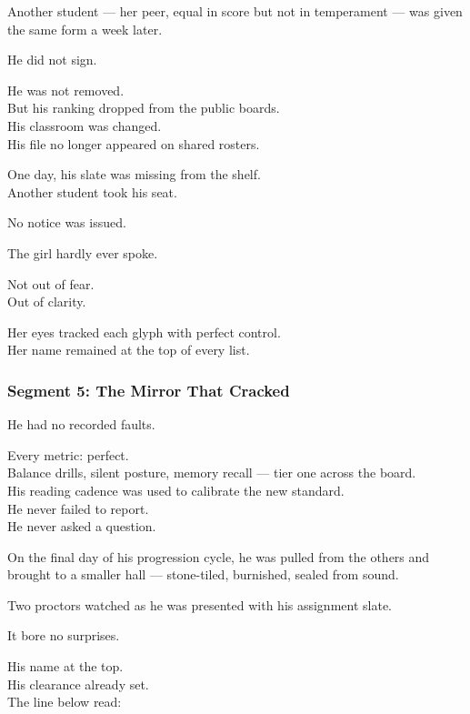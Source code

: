 \documentclass[9pt]{article}
\begin{document}
\vspace{1em}

Another student — her peer, equal in score but not in temperament — was given the same form a week later.

He did not sign.

He was not removed.\\
But his ranking dropped from the public boards.\\
His classroom was changed.\\
His file no longer appeared on shared rosters.

One day, his slate was missing from the shelf.\\
Another student took his seat.

No notice was issued.

\vspace{1em}

The girl hardly ever spoke.

Not out of fear.\\
Out of clarity.

Her eyes tracked each glyph with perfect control.\\
Her name remained at the top of every list.

\newpage

\subsubsection*{Segment 5: The Mirror That Cracked}

He had no recorded faults.

Every metric: perfect.\\
Balance drills, silent posture, memory recall — tier one across the board.\\
His reading cadence was used to calibrate the new standard.\\
He never failed to report.\\
He never asked a question.

\vspace{1em}

On the final day of his progression cycle, he was pulled from the others and brought to a smaller hall — stone-tiled, burnished, sealed from sound.

Two proctors watched as he was presented with his assignment slate.

It bore no surprises.

His name at the top.\\
His clearance already set.\\
The line below read:
\end{document}
